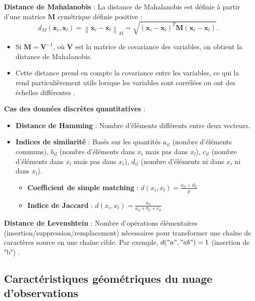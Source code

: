 \documentclass[10pt,a4paper]{article}
\begin{document}
\textbf{Distance de Mahalanobis} :
La distance de Mahalanobis est définie à partir d'une matrice $\mathbf{M}$ symétrique définie positive :
$$d_M(\mathbf{x}_i, \mathbf{x}_l) = \left\| \mathbf{x}_i - \mathbf{x}_l \right\|_{M} = \sqrt{(\mathbf{x}_i - \mathbf{x}_l)^T \mathbf{M}(\mathbf{x}_i - \mathbf{x}_l)}.$$
\begin{itemize}
    \item Si $\mathbf{M} = \mathbf{V}^{-1}$, où $\mathbf{V}$ est la matrice de covariance des variables, on obtient la distance de Mahalanobis.
    \item Cette distance prend en compte la covariance entre les variables, ce qui la rend particulièrement utile lorsque les variables sont corrélées ou ont des échelles différentes \cite{mahalanobis-wikipedia, mahalanobis-machinelearningplus}.
\end{itemize}

\textbf{Cas des données discrètes quantitatives} :
\begin{itemize}
    \item \textbf{Distance de Hamming} : Nombre d'éléments différents entre deux vecteurs.
    \item \textbf{Indices de similarité} : Basés sur les quantités $a_{il}$ (nombre d'éléments communs), $b_{il}$ (nombre d'éléments dans $x_i$ mais pas dans $x_l$), $c_{il}$ (nombre d'éléments dans $x_l$ mais pas dans $x_i$), $d_{il}$ (nombre d'éléments ni dans $x_i$ ni dans $x_l$).
    \begin{itemize}
        \item \textbf{Coefficient de simple matching} : $d(x_i, x_l) = \frac{a_{il} + d_{il}}{p}$
        \item \textbf{Indice de Jaccard} : $d(x_i, x_l) = \frac{a_{il}}{a_{il} + b_{il} + c_{il}}$
    \end{itemize}
\end{itemize}

\textbf{Distance de Levenshtein} :
Nombre d'opérations élémentaires (insertion/suppression/remplacement) nécessaires pour transformer une chaîne de caractères source en une chaîne cible. Par exemple, $d("a", "ab") = 1$ (insertion de "b") \cite{levenshtein-wikipedia}.

\subsection*{Caractéristiques géométriques du nuage d'observations}
\end{document}
